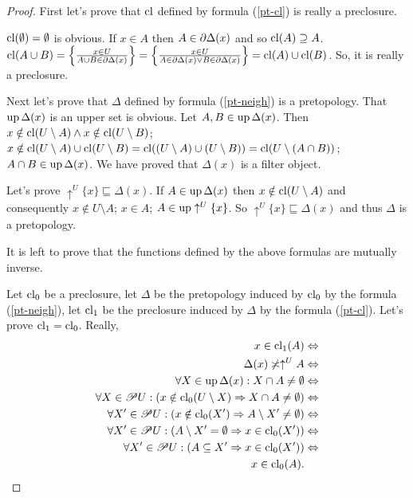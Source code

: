 \begin{proof}
First let's prove that $\operatorname{cl}$ defined by formula (\ref{pt-cl}) is
really a preclosure.

$\operatorname{cl}(\emptyset)=\emptyset$ is obvious. If $x\in A$ then $A\in\partial\Delta(x)$
and so $\operatorname{cl}(A)\supseteq A$. $\operatorname{cl}(A\cup B)=\left\{ \frac{x\in U}{A\cup B\in\partial\Delta(x)}\right\}=\left\{ \frac{x\in U}{A\in\partial\Delta(x)\lor B\in\partial\Delta(x)}\right\}=\operatorname{cl}(A)\cup\operatorname{cl}(B)$.
So, it is really a preclosure.

Next let's prove that $\Delta$ defined by formula (\ref{pt-neigh})
is a pretopology. That $\operatorname{up}\Delta(x)$ is an upper set is obvious.
Let $A,B\in\operatorname{up}\Delta(x)$. Then $x\notin\operatorname{cl}(U\setminus A)\land x\notin\operatorname{cl}(U\setminus B)$;
$x\notin\operatorname{cl}(U\setminus A)\cup\operatorname{cl}(U\setminus B)=\operatorname{cl}((U\setminus A)\cup(U\setminus B))=\operatorname{cl}(U\setminus(A\cap B))$;
$A\cap B\in\operatorname{up}\Delta(x)$. We have proved that $\Delta(x)$ is a filter
object.

Let's prove $\uparrow^{U}\{x\}\sqsubseteq\Delta(x)$. If $A\in\operatorname{up}\Delta(x)$
then $x\notin\operatorname{cl}(U\setminus A)$ and consequently $x\notin U\setminus A$;
$x\in A$; $A\in\operatorname{up}\uparrow^{U}\{x\}$. So $\uparrow^{U}\{x\}\sqsubseteq\Delta(x)$
and thus $\Delta$ is a pretopology.

It is left to prove that the functions defined by the above formulas
are mutually inverse.

Let $\operatorname{cl}_{0}$ be a preclosure, let $\Delta$ be the pretopology induced
by $\operatorname{cl}_{0}$ by the formula (\ref{pt-neigh}), let $\operatorname{cl}_{1}$ be
the preclosure induced by $\Delta$ by the formula (\ref{pt-cl}).
Let's prove $\operatorname{cl}_{1}=\operatorname{cl}_{0}$. Really,
\begin{align*}
x\in\operatorname{cl}_{1}(A) & \Leftrightarrow\\
\Delta(x)\not\asymp\uparrow^{U}A & \Leftrightarrow\\
\forall X\in\operatorname{up}\Delta(x):X\cap A\ne\emptyset & \Leftrightarrow\\
\forall X\in\mathscr{P} U:(x\notin\operatorname{cl}_{0}(U\setminus X)\Rightarrow X\cap A\ne\emptyset) & \Leftrightarrow\\
\forall X'\in\mathscr{P} U:(x\notin\operatorname{cl}_{0}(X')\Rightarrow A\setminus X'\ne\emptyset) & \Leftrightarrow\\
\forall X'\in\mathscr{P} U:(A\setminus X'=\emptyset\Rightarrow x\in\operatorname{cl}_{0}(X')) & \Leftrightarrow\\
\forall X'\in\mathscr{P} U:(A\subseteq X'\Rightarrow x\in\operatorname{cl}_{0}(X')) & \Leftrightarrow\\
x\in\operatorname{cl}_{0}(A).
\end{align*}



\end{proof}
